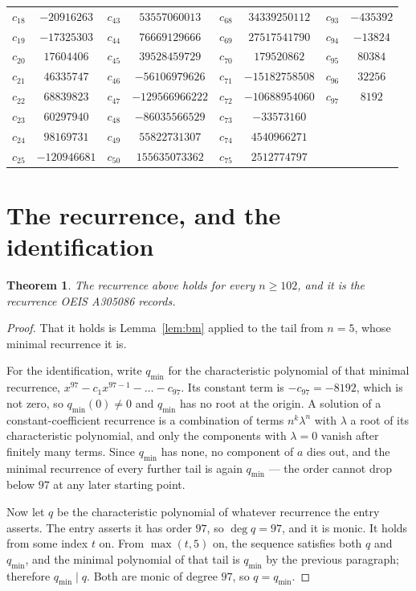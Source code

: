 \documentclass[11pt,a4paper]{article}
\theoremstyle{plain}
\newtheorem{theorem}{Theorem}
\theoremstyle{definition}
\begin{document}
\begin{center}
\begin{tabular}{cccccccc}
$c_{18}$ & $-20916263$ & $c_{43}$ & $53557060013$ & $c_{68}$ & $34339250112$ & $c_{93}$ & $-435392$ \\
$c_{19}$ & $-17325303$ & $c_{44}$ & $76669129666$ & $c_{69}$ & $27517541790$ & $c_{94}$ & $-13824$ \\
$c_{20}$ & $17604406$ & $c_{45}$ & $39528459729$ & $c_{70}$ & $179520862$ & $c_{95}$ & $80384$ \\
$c_{21}$ & $46335747$ & $c_{46}$ & $-56106979626$ & $c_{71}$ & $-15182758508$ & $c_{96}$ & $32256$ \\
$c_{22}$ & $68839823$ & $c_{47}$ & $-129566966222$ & $c_{72}$ & $-10688954060$ & $c_{97}$ & $8192$ \\
$c_{23}$ & $60297940$ & $c_{48}$ & $-86035566529$ & $c_{73}$ & $-33573160$ &  &  \\
$c_{24}$ & $98169731$ & $c_{49}$ & $55822731307$ & $c_{74}$ & $4540966271$ &  &  \\
$c_{25}$ & $-120946681$ & $c_{50}$ & $155635073362$ & $c_{75}$ & $2512774797$ &  &  \\
\end{tabular}
\end{center}

\section{The recurrence, and the identification}

\begin{theorem}
The recurrence above holds for every $n\ge102$, and it is the recurrence OEIS A305086 records.
\end{theorem}

\begin{proof}
That it holds is Lemma~\ref{lem:bm} applied to the tail from $n=5$, whose minimal
recurrence it is.

For the identification, write $q_{\min}$ for the characteristic polynomial of that minimal
recurrence, $x^{97}-c_1x^{97-1}-\dots-c_{97}$. Its constant term is
$-c_{97}=-8192$, which is not zero, so $q_{\min}(0)\neq0$ and $q_{\min}$ has no
root at the origin. A solution of a constant-coefficient recurrence is a combination of terms
$n^{k}\lambda^{n}$ with $\lambda$ a root of its characteristic polynomial, and only the
components with $\lambda=0$ vanish after finitely many terms. Since $q_{\min}$ has none, no
component of $a$ dies out, and the minimal recurrence of every further tail is again
$q_{\min}$ --- the order cannot drop below $97$ at any later starting point.

Now let $q$ be the characteristic polynomial of whatever recurrence the entry asserts. The
entry asserts it has order $97$, so $\deg q=97$, and it is monic. It holds from some
index $t$ on. From $\max(t,5)$ on, the sequence satisfies both $q$ and $q_{\min}$, and
the minimal polynomial of that tail is $q_{\min}$ by the previous paragraph; therefore
$q_{\min}\mid q$. Both are monic of degree $97$, so $q=q_{\min}$.
\end{proof}
\end{document}
